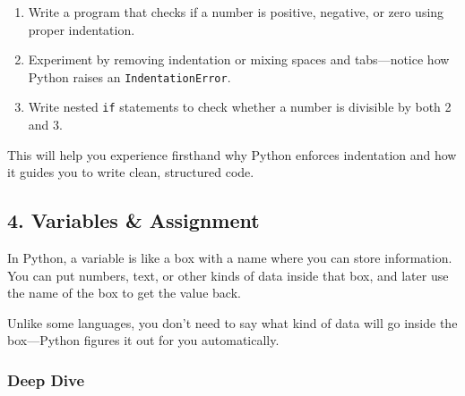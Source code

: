 \documentclass[
  letterpaper,
  DIV=11,
  numbers=noendperiod]{scrreprt}
\providecommand{\tightlist}{%
  \setlength{\itemsep}{0pt}\setlength{\parskip}{0pt}}
\begin{document}
\begin{enumerate}
\def\labelenumi{\arabic{enumi}.}
\tightlist
\item
  Write a program that checks if a number is positive, negative, or zero
  using proper indentation.
\item
  Experiment by removing indentation or mixing spaces and tabs---notice
  how Python raises an \texttt{IndentationError}.
\item
  Write nested \texttt{if} statements to check whether a number is
  divisible by both 2 and 3.
\end{enumerate}

This will help you experience firsthand why Python enforces indentation
and how it guides you to write clean, structured code.

\subsection{4. Variables \& Assignment}\label{variables-assignment}

In Python, a variable is like a box with a name where you can store
information. You can put numbers, text, or other kinds of data inside
that box, and later use the name of the box to get the value back.

Unlike some languages, you don't need to say what kind of data will go
inside the box---Python figures it out for you automatically.

\subsubsection{Deep Dive}\label{deep-dive-3}
\end{document}
